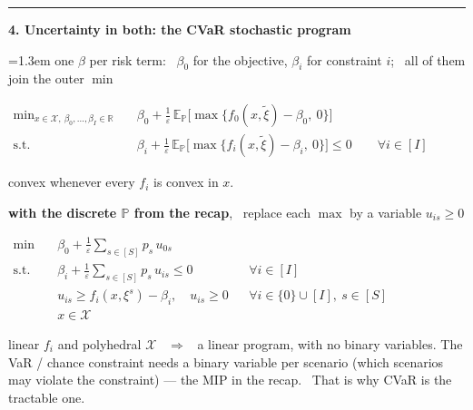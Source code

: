 \documentclass[10pt]{article}
\newcommand{\beat}[2]{%
  \par\bigskip\vspace{4pt}
  {\color{ruleink}\rule{\textwidth}{1pt}}\par\nobreak\vspace{4pt}
  {\large\bfseries #1.\; #2}\par\nobreak\vspace{6pt}}
\newenvironment{board}{%
  \par\vspace{4pt}
  \begingroup\leftskip=1.3em\relax\parskip=2pt\relax}{%
  \par\endgroup\vspace{4pt}}
\newcommand{\E}{\mathbb{E}}
\newcommand{\Prob}{\mathbb{P}}
\newcommand{\xit}{\tilde\xi}
\begin{document}
\beat{4}{Uncertainty in both: the CVaR stochastic program}
\begin{board}
\quad one $\beta$ per risk term: \ $\beta_0$ for the objective, $\beta_i$ for constraint $i$; \ all of them join the outer $\min$
\vspace{4pt}

\begin{center}
$\begin{aligned}
  \min_{x \in \mathcal{X},\ \beta_0, \dots, \beta_I \in \mathbb{R}}\quad
    & \beta_0 + \frac{1}{\varepsilon}\,\E_{\Prob}\Big[\max\big\{f_0(x, \xit) - \beta_0,\ 0\big\}\Big] \\
  \text{s.t.}\quad
    & \beta_i + \frac{1}{\varepsilon}\,\E_{\Prob}\Big[\max\big\{f_i(x, \xit) - \beta_i,\ 0\big\}\Big] \le 0 \qquad \forall i \in [I]
\end{aligned}$
\end{center}
\vspace{4pt}

\quad convex whenever every $f_i$ is convex in $x$.
\vspace{8pt}

\quad \textbf{with the discrete $\Prob$ from the recap}, \ replace each $\max$ by a variable $u_{is} \ge 0$
\vspace{4pt}

\begin{center}
$\begin{aligned}
  \min\quad & \beta_0 + \frac{1}{\varepsilon}\sum_{s \in [S]} p_s\, u_{0s} \\
  \text{s.t.}\quad & \beta_i + \frac{1}{\varepsilon}\sum_{s \in [S]} p_s\, u_{is} \le 0 && \forall i \in [I] \\
                   & u_{is} \ge f_i(x, \xi^s) - \beta_i, \quad u_{is} \ge 0 && \forall i \in \{0\} \cup [I],\ s \in [S] \\
                   & x \in \mathcal{X}
\end{aligned}$
\end{center}
\vspace{4pt}

\quad linear $f_i$ and polyhedral $\mathcal{X}$ \ $\Rightarrow$ \ a linear program, with no binary variables. \quad
The VaR / chance constraint needs a binary variable per scenario (which scenarios may violate the constraint)
--- the MIP in the recap. \ That is why CVaR is the tractable one.
\end{board}
\end{document}
